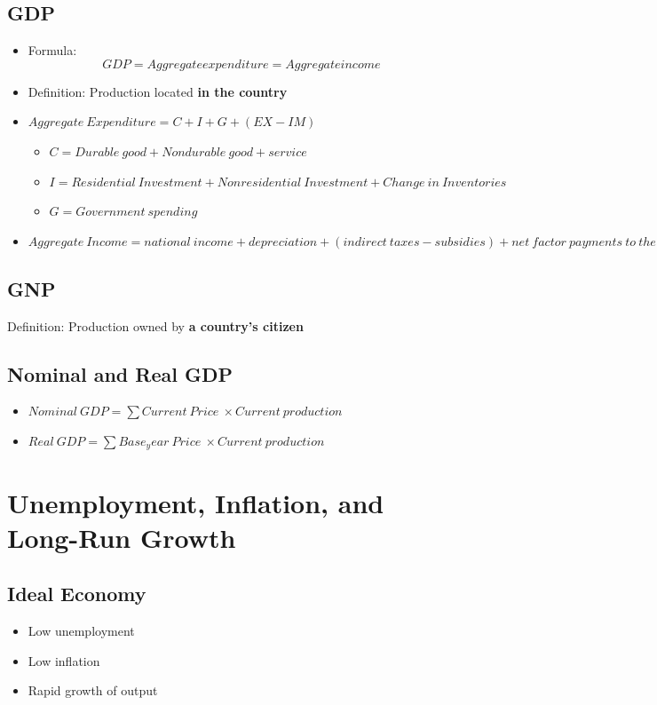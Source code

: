 \documentclass[11pt]{article}
\begin{document}
\subsection{GDP}
    \begin{itemize}
        \item Formula:
            \begin{equation}
                GDP = Aggregate expenditure=Aggregate income
            \end{equation}
        \item Definition: Production located \textbf{in the country}
        \item $Aggregate\ Expenditure = C + I + G + (EX - IM)$
        \begin{itemize}
            \item $C = Durable\ good + Nondurable\ good + service$
            \item $I = Residential\ Investment + Nonresidential\ Investment + Change\ in\ Inventories$
            \item $G = Government\ spending$
        \end{itemize}
        \item $Aggregate\ Income = national\ income + depreciation + (indirect\ taxes - subsidies) + net\ factor\ payments\ to\ the\ rest\ of\ the\ world + other$
    \end{itemize}
\subsection{GNP}
    Definition: Production owned by \textbf{a country’s citizen}

\subsection{Nominal and Real GDP}
\begin{itemize}
    \item $Nominal\ GDP = \sum Current\ Price\ \times Current\ production$
    \item $Real\ GDP = \sum {Base_year\ Price\ \times Current\ production}$
\end{itemize}

\section{Unemployment, Inflation, and Long-Run Growth}
\subsection{Ideal Economy}
    \begin{itemize}
        \item Low unemployment
        \item Low inflation
        \item Rapid growth of output
    \end{itemize}
\end{document}

